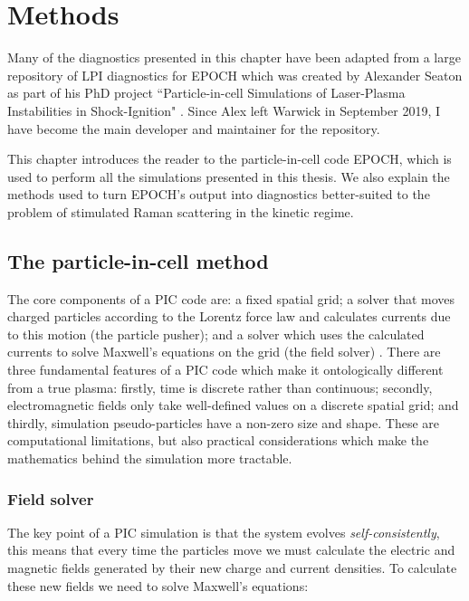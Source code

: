 \chapter{Methods}
\label{chp:methods}
 
Many of the diagnostics presented in this chapter have been adapted from a large repository of LPI diagnostics for EPOCH which was created by Alexander Seaton as part of his PhD project ``Particle-in-cell Simulations of Laser-Plasma Instabilities in Shock-Ignition" \citep{Seaton2019}. Since Alex left Warwick in September 2019, I have become the main developer and maintainer for the repository.

This chapter introduces the reader to the particle-in-cell code EPOCH, which is used to perform all the simulations presented in this thesis. We also explain the methods used to turn EPOCH's output into diagnostics better-suited to the problem of stimulated Raman scattering in the kinetic regime. 

\section{The particle-in-cell method}
The core components of a PIC code are: a fixed spatial grid; a solver that moves charged particles according to the Lorentz force law and calculates currents due to this motion (the particle pusher); and a solver which uses the calculated currents to solve Maxwell's equations on the grid (the field solver) \citep{Arber2015}. There are three fundamental features of a PIC code which make it ontologically different from a true plasma: firstly, time is discrete rather than continuous; secondly, electromagnetic fields only take well-defined values on a discrete spatial grid; and thirdly, simulation pseudo-particles have a non-zero size and shape. These are computational limitations, but also practical considerations which make the mathematics behind the simulation more tractable.


\subsection{Field solver}
The key point of a PIC simulation is that the system evolves \emph{self-consistently}, this means that every time the particles move we must calculate the electric and magnetic fields generated by their new charge and current densities. To calculate these new fields we need to solve Maxwell's equations:

